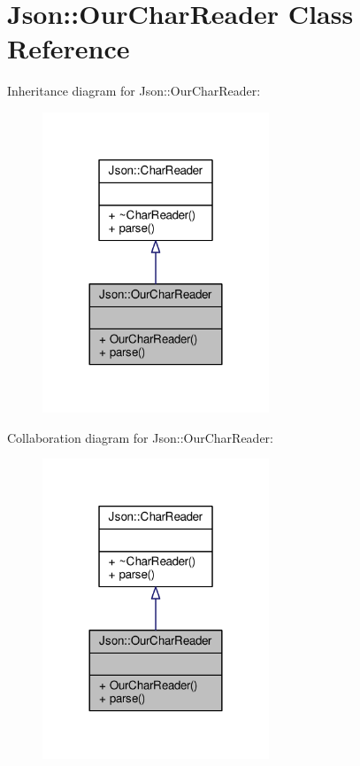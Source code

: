 \hypertarget{classJson_1_1OurCharReader}{}\section{Json\+:\+:Our\+Char\+Reader Class Reference}
\label{classJson_1_1OurCharReader}


Inheritance diagram for Json\+:\+:Our\+Char\+Reader\+:
\nopagebreak
\begin{figure}[H]
\begin{center}
\leavevmode
\includegraphics[width=192pt]{dc/d24/classJson_1_1OurCharReader__inherit__graph}
\end{center}
\end{figure}


Collaboration diagram for Json\+:\+:Our\+Char\+Reader\+:
\nopagebreak
\begin{figure}[H]
\begin{center}
\leavevmode
\includegraphics[width=192pt]{d0/d6d/classJson_1_1OurCharReader__coll__graph}
\end{center}
\end{figure}

